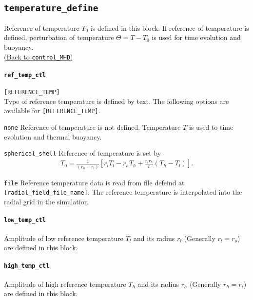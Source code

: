 \subsection{\tt temperature\_define}
\label{href_t:temperature_define}
Reference of temperature $T_{0}$ is defined in this block. If reference of temperature is defined, perturbation of temperature $\Theta = T - T_{0}$ is used for time evolution and buoyancy. \\
\hyperref[href_i:temperature_define]{(Back to {\tt control\_MHD})}

\paragraph{\tt ref\_temp\_ctl}
\label{href_t:ref_temp_ctl}
\verb|[REFERENCE_TEMP]| \\
Type of reference temperature is defined by text. The following options are available for \verb|[REFERENCE_TEMP]|.
%
\begin{description}
\item{\tt none}   Reference of temperature is not defined. Temperature $T$ is used to time evolution and thermal buoyancy.
\item{\tt spherical\_shell} Reference of temperature is set by
\begin{eqnarray}
 T_{0} = \frac{1}{\left(r_{h}-r_{l} \right)} \left[
          r_{l}T_{l} - r_{h}T_{h} + \frac{r_{l} r_{h}}{r} \left(T_{h}-T_{l}\right) \right].
\nonumber
\end{eqnarray}
\item{\tt file} Reference temperature data is read from file defeind at {\tt [radial\_field\_file\_name]}. The reference temperature is interpolated into the radial grid in the simulation.
\end{description}
%

\paragraph{\tt low\_temp\_ctl}
\label{href_t:low_temp_ctl}
Amplitude of low reference temperature $T_{l}$ and its radius $r_{l}$ (Generally $r_{l} = r_{o}$) are defined in this block.

\paragraph{\tt high\_temp\_ctl}
\label{href_t:high_temp_ctl}
Amplitude of high reference temperature $T_{h}$ and its radius $r_{h}$ (Generally $r_{h} = r_{i}$) are defined in this block.

